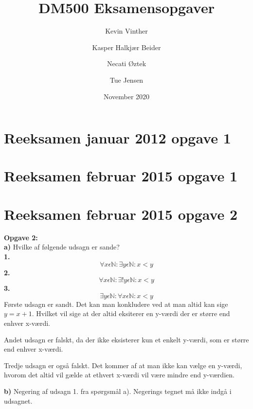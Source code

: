 \documentclass{article}
\title{DM500 Eksamensopgaver}
\author{ Kevin Vinther \and Kasper Halkjær Beider \and Necati Øztek \and Tue Jensen }
\date{November 2020}
\begin{document}
\maketitle

\newpage

\section{Reeksamen januar 2012 opgave 1}

\section{Reeksamen februar 2015 opgave 1}

\section{Reeksamen februar 2015 opgave 2}

\textbf{Opgave 2:}\\
\textbf{a)} Hvilke af følgende udsagn er sande?\\
\textbf{1.} 
\begin{displaymath}
\forall x \epsilon \mathbb{N}: \exists y \epsilon \mathbb{N}: x<y
\end{displaymath}
\textbf{2.}\begin{displaymath}
\forall x \epsilon \mathbb{N}: \exists !y \epsilon \mathbb{N}: x<y
\end{displaymath}
\textbf{3.}\begin{displaymath}
\exists y  \epsilon \mathbb{N}: \forall x  \epsilon  \mathbb{N}: x<y
\end{displaymath}
Første udsagn er sandt. Det kan man konkludere ved at man altid kan sige \(y = x + 1\). Hvilket vil sige at der altid eksiterer en y-værdi der er større end enhver x-værdi. 

Andet udsagn er falskt, da der ikke eksisterer kun et enkelt y-værdi, som er større end enhver x-værdi. 

Tredje udsagn er også falskt. Det kommer af at man ikke kan vælge en y-værdi, hvorom det altid vil gælde at ethvert x-værdi vil være mindre end y-værdien.

\textbf{b)} Negering af udsagn 1. fra spørgsmål a). Negerings tegnet må ikke indgå i udsagnet. 
\end{document}
